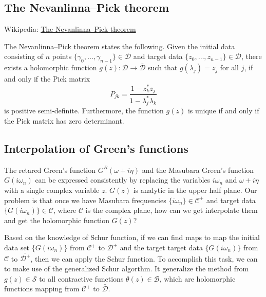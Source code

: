 \documentclass[
	preprint,%
	aps,
	prb,
	showpacs,	
	amsmath, amssymb]{revtex4-2}
\DeclareRobustCommand{\+}{\hstretch{1.25} {\boldsymbol {\mathrel{+}}}}
\newcommand{\C}{ {\mathcal{C}} }
\newcommand{\D}{ {\mathcal{D}} }
\newcommand{\Dbar}{ {\bar{\mathcal{D}}} }
\newcommand{\B}{ {\mathcal{B}} }
\begin{document}
\subsection{The Nevanlinna–Pick theorem}
\label{subsec:pick-theorem}

Wikipedia: 
\href{https://en.wikipedia.org/wiki/Nevanlinna%E2%80%93Pick_interpolation}{The Nevanlinna–Pick theorem}

The Nevanlinna–Pick theorem states the following.
Given the initial data consisting of $n$ points 
$\{\gamma_0, \dots, \gamma_{n-1} \} \in \D$ and target data
$\{z_0, \dots, z_{n-1} \} \in \D$, there exists 
a holomorphic function $g(z): \D \to \Dbar$ 
such that $g(\lambda_j) = z_j$ for all $j$, if and only if 
the Pick matrix
\begin{equation}
	P_{jk} = \frac{1-z_k^* z_j}{1 - \lambda_j^* \lambda_k}
\end{equation}
is positive semi-definite. Furthermore, the function $g(z)$ is 
unique if and only if the Pick matrix has zero determinant.


\subsection{Interpolation of Green's functions}
\label{subsec:interpolation-of-GF}

The retared Green's function $G^R(\omega + i\eta)$ and the Masubara 
Green's function $G(i\omega_n)$ can be expressed consistently by replacing 
the variables $i\omega_n$ and $\omega + i\eta$ with a single complex 
variable $z$. $G(z)$ is analytic in the upper half plane. 
Our problem is that once we have Masubara frequencies $\{i\omega_n\} \in \C^+$ 
and target data $\{ G(i\omega_n)\} \in \C$, where $\C$ is 
the complex plane, how can we get interpolate them and get the 
holomorphic function $G(z)$?

Based on the knowledge of Schur function, if we can find maps 
to map the initial data set $\{ G(i\omega_n)\}$
from $\C^+$ to $\D^+$ and the target 
target data $\{ G(i\omega_n)\}$ from $\C$ to $\bar{\D^+}$, 
then we can apply the Schur function. 
To accomplish this task, we can to make use of the generalized 
Schur algorthm\cite{adamyan2003reconstruction}. It generalize the 
method from $g(z) \in \mathcal{S}$ to all contractive functions 
$\theta(z) \in \B$, which 
are holomorphic functions mapping from $\mathcal{C^+}$ 
to $\Dbar$.	
\end{document}
